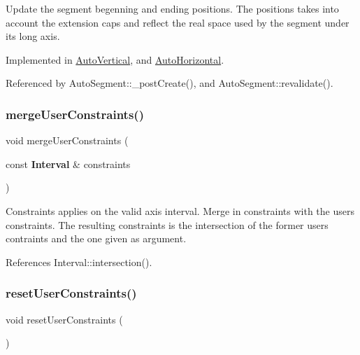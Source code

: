 Update the segment begenning and ending positions. The positions takes into account the extension caps and reflect the real space used by the segment under it\textquotesingle{}s long axis. 

Implemented in \mbox{\hyperlink{classKatabatic_1_1AutoVertical_a9662a77c2ed8553d6a0312c5292060ad}{Auto\+Vertical}}, and \mbox{\hyperlink{classKatabatic_1_1AutoHorizontal_a9662a77c2ed8553d6a0312c5292060ad}{Auto\+Horizontal}}.



Referenced by Auto\+Segment\+::\+\_\+post\+Create(), and Auto\+Segment\+::revalidate().

\mbox{\label{classKatabatic_1_1AutoSegment_ae82ffef92ad9ffdc5da5e0c1830d9537}} 
\subsubsection{\texorpdfstring{merge\+User\+Constraints()}{mergeUserConstraints()}}
{\footnotesize\ttfamily void merge\+User\+Constraints (\begin{DoxyParamCaption}\item[{const \textbf{ Interval} \&}]{constraints }\end{DoxyParamCaption})}

Constraints applies on the valid axis interval. Merge in {\ttfamily constraints} with the user\textquotesingle{}s constraints. The resulting constraints is the intersection of the former user\textquotesingle{}s contraints and the one given as argument. 

References Interval\+::intersection().

\mbox{\label{classKatabatic_1_1AutoSegment_ac8768352909d37ebad1c06c9cf4ef8bb}} 
\subsubsection{\texorpdfstring{reset\+User\+Constraints()}{resetUserConstraints()}}
{\footnotesize\ttfamily void reset\+User\+Constraints (\begin{DoxyParamCaption}{ }\end{DoxyParamCaption})\hspace{0.3cm}{\ttfamily [inline]}}

